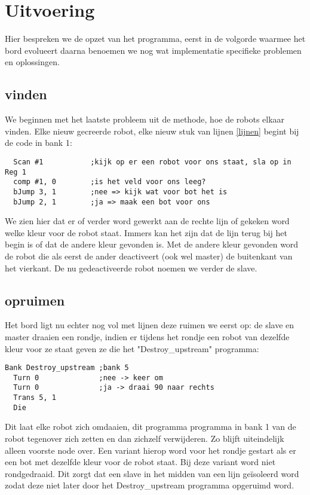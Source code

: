 \documentclass[10pt]{article}
\begin{document}
\section{Uitvoering}

Hier bespreken we de opzet van het programma, eerst in de volgorde waarmee het bord evolueert daarna benoemen we nog wat implementatie specifieke problemen en oplossingen.

\subsection{vinden}
We beginnen met het laatste probleem uit de methode, hoe de robots elkaar vinden. Elke nieuw gecreerde robot, elke nieuw stuk van lijnen \ref{lijnen} begint bij de code in bank 1:

\begin{verbatim}
  Scan #1           ;kijk op er een robot voor ons staat, sla op in Reg 1
  comp #1, 0        ;is het veld voor ons leeg?
  bJump 3, 1        ;nee => kijk wat voor bot het is
  bJump 2, 1        ;ja => maak een bot voor ons
\end{verbatim}

We zien hier dat er of verder word gewerkt aan de rechte lijn of gekeken word welke kleur voor de robot staat. Immers kan het zijn dat de lijn terug bij het begin is of dat de andere kleur gevonden is. Met de andere kleur gevonden word de robot die als eerst de ander deactiveert (ook wel master) de buitenkant van het vierkant. De nu gedeactiveerde robot noemen we verder de slave.

\subsection{opruimen}
Het bord ligt nu echter nog vol met lijnen deze ruimen we eerst op: de slave en master draaien een rondje, indien er tijdens het rondje een robot van dezelfde kleur voor ze staat geven ze die het "Destroy\_upstream" programma:

\begin{verbatim}
Bank Destroy_upstream ;bank 5
  Turn 0              ;nee -> keer om
  Turn 0              ;ja -> draai 90 naar rechts
  Trans 5, 1
  Die
\end{verbatim}

Dit laat elke robot zich omdaaien, dit programma programma in bank 1 van de robot tegenover zich zetten en dan zichzelf verwijderen. Zo blijft uiteindelijk alleen voorste node over. Een variant hierop word voor het rondje gestart als er een bot met dezelfde kleur voor de robot staat. Bij deze variant word niet rondgedraaid. Dit zorgt dat een slave in het midden van een lijn geïsoleerd word zodat deze niet later door het Destroy\_upstream programma opgeruimd word.
\end{document}
